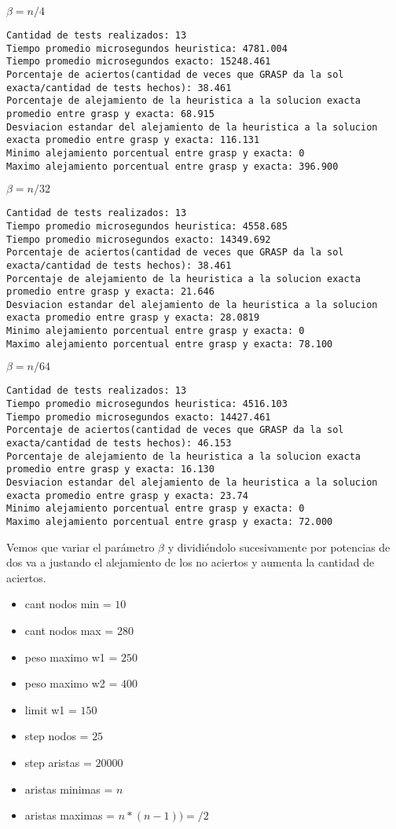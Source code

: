 $\beta= n/4$
\begin{lstlisting}[frame=single]
Cantidad de tests realizados: 13
Tiempo promedio microsegundos heuristica: 4781.004
Tiempo promedio microsegundos exacto: 15248.461
Porcentaje de aciertos(cantidad de veces que GRASP da la sol exacta/cantidad de tests hechos): 38.461
Porcentaje de alejamiento de la heuristica a la solucion exacta promedio entre grasp y exacta: 68.915
Desviacion estandar del alejamiento de la heuristica a la solucion exacta promedio entre grasp y exacta: 116.131
Minimo alejamiento porcentual entre grasp y exacta: 0
Maximo alejamiento porcentual entre grasp y exacta: 396.900
\end{lstlisting}
$\beta=n/32$
\begin{lstlisting}[frame=single]
Cantidad de tests realizados: 13
Tiempo promedio microsegundos heuristica: 4558.685
Tiempo promedio microsegundos exacto: 14349.692
Porcentaje de aciertos(cantidad de veces que GRASP da la sol exacta/cantidad de tests hechos): 38.461
Porcentaje de alejamiento de la heuristica a la solucion exacta promedio entre grasp y exacta: 21.646
Desviacion estandar del alejamiento de la heuristica a la solucion exacta promedio entre grasp y exacta: 28.0819
Minimo alejamiento porcentual entre grasp y exacta: 0
Maximo alejamiento porcentual entre grasp y exacta: 78.100
\end{lstlisting}
$\beta=n/64$
\begin{lstlisting}[frame=single]
Cantidad de tests realizados: 13
Tiempo promedio microsegundos heuristica: 4516.103
Tiempo promedio microsegundos exacto: 14427.461
Porcentaje de aciertos(cantidad de veces que GRASP da la sol exacta/cantidad de tests hechos): 46.153
Porcentaje de alejamiento de la heuristica a la solucion exacta promedio entre grasp y exacta: 16.130
Desviacion estandar del alejamiento de la heuristica a la solucion exacta promedio entre grasp y exacta: 23.74
Minimo alejamiento porcentual entre grasp y exacta: 0
Maximo alejamiento porcentual entre grasp y exacta: 72.000
\end{lstlisting}

Vemos que variar el par\'ametro $\beta$ y dividi\'endolo sucesivamente por potencias de dos va a justando el alejamiento de los no aciertos y aumenta la cantidad de aciertos.

\vspace{2mm}


\begin{itemize}
	\item cant nodos min = $10$
	\item cant nodos max = $280$
	\item peso maximo w1 = $250$
	\item peso maximo w2 = $400$
	\item limit w1 = $150$
	\item step nodos = $25$
	\item step aristas = $20000$
	\item aristas minimas = $n$
	\item aristas maximas = $n * (n-1))=/2$
\end{itemize}


